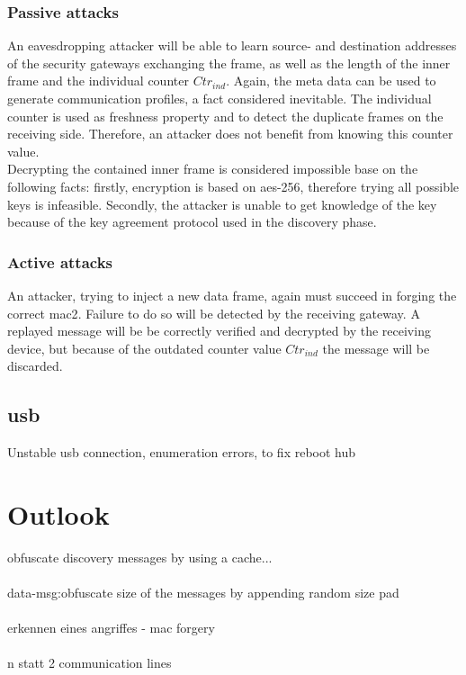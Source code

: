 \subsubsection{Passive attacks}
An eavesdropping attacker will be able to learn source- and destination addresses of the security gateways exchanging the frame, as well as the length of the inner frame and the
individual counter $Ctr_{ind}$. Again, the meta data can be used to generate communication profiles, a fact considered inevitable. The individual counter is used as freshness property
and to detect the duplicate frames on the receiving side. Therefore, an attacker does not benefit from knowing this counter value.
\\
Decrypting the contained inner frame is considered impossible base on the following facts: firstly, encryption is based on \gls{aes}-256, therefore trying all possible keys is infeasible.
Secondly, the attacker is unable to get knowledge of the key because of the key agreement protocol used in the discovery phase.
\subsubsection{Active attacks}
An attacker, trying to inject a new data frame, again must succeed in forging the correct \gls{mac2}. Failure to do so will be detected by the receiving gateway.
A replayed message will be be correctly verified and decrypted by the receiving device, but because of the outdated counter value $Ctr_{ind}$ the message will be discarded.

\subsection{\gls{usb}}
Unstable \gls{usb} connection, enumeration errors, to fix reboot hub

\section{Outlook}
obfuscate discovery messages by using a cache...
\\
\\
data-msg:obfuscate size of the messages by appending random size pad
\\
\\
erkennen eines angriffes - mac forgery
\\
\\
n statt 2 communication lines
